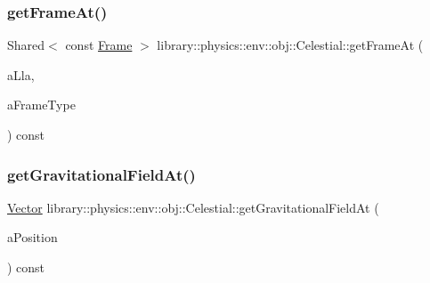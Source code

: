 \subsubsection{\texorpdfstring{get\+Frame\+At()}{getFrameAt()}}
{\footnotesize\ttfamily Shared$<$ const \hyperlink{classlibrary_1_1physics_1_1coord_1_1_frame}{Frame} $>$ library\+::physics\+::env\+::obj\+::\+Celestial\+::get\+Frame\+At (\begin{DoxyParamCaption}\item[{const \hyperlink{classlibrary_1_1physics_1_1coord_1_1spherical_1_1_l_l_a}{L\+LA} \&}]{a\+Lla,  }\item[{const \hyperlink{classlibrary_1_1physics_1_1env_1_1obj_1_1_celestial_a8585fb32125cb6c73ae1339a5ea09c79}{Celestial\+::\+Frame\+Type} \&}]{a\+Frame\+Type }\end{DoxyParamCaption}) const}

\mbox{\label{classlibrary_1_1physics_1_1env_1_1obj_1_1_celestial_aa6313086a85ad19128d16f376a32aefe}} 
\subsubsection{\texorpdfstring{get\+Gravitational\+Field\+At()}{getGravitationalFieldAt()}}
{\footnotesize\ttfamily \hyperlink{classlibrary_1_1physics_1_1data_1_1_vector}{Vector} library\+::physics\+::env\+::obj\+::\+Celestial\+::get\+Gravitational\+Field\+At (\begin{DoxyParamCaption}\item[{const \hyperlink{classlibrary_1_1physics_1_1coord_1_1_position}{Position} \&}]{a\+Position }\end{DoxyParamCaption}) const}

\mbox{\label{classlibrary_1_1physics_1_1env_1_1obj_1_1_celestial_a2e8341c35d9c4c07eed4ce9aa5d9acc2}} 
